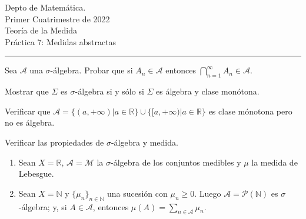 \documentclass{book}
\newcommand{\rr}{\mathbb{R}}
\newcommand{\nn}{\mathbb{N}}
\begin{document}


\begin{large}
\begin{bfseries} %
        \noindent Depto de Matem\'atica.\\
        Primer Cuatrimestre de 2022\\                                                                                                                                                                                                                                                                                                                                                
        Teoría de la Medida \\
        Práctica 7: Medidas abstractas

\end{bfseries}
\end{large}
\par\noindent\rule{\textwidth}{.5pt}






\begin{ejer}{}
Sea $\mathcal{A}$ una $\sigma$-álgebra.
Probar que si $A_n \in \mathcal{A}$ entonces $\bigcap\limits_{n=1}^{\infty} A_n \in \mathcal{A}$.
\end{ejer}

\begin{ejer}{}
 Mostrar que  $\Sigma$ es $\sigma$-álgebra si y sólo si $\Sigma$ es álgebra y clase monótona.
\end{ejer}


\begin{ejer}{}
 Verificar que $\mathcal{A}=\{(a,+\infty)|a \in \rr\}\cup \{[a,+\infty)|a \in \rr\}$ es clase mónotona pero no 
es álgebra.
\end{ejer}

\begin{ejer}{} Verificar las propiedades de $\sigma$-álgebra y medida.
\begin{enumerate}
\item Sean $X=\rr$, $\mathcal{A}=\mathcal{M}$ la $\sigma$-álgebra de los conjuntos medibles y $\mu$ la medida de Lebesgue.
\item Sean $X=\nn$ y $\{\mu_n\}_{n \in \nn}$ una sucesión con $\mu_n\geq 0$. 
Luego $\mathcal{A}=\mathcal{P}(\nn)$ es $\sigma$-álgebra; y, si $A\in \mathcal{A}$, entonces 
$\mu(A)=\sum\limits_{n \in \mathcal{A}} \mu_n$.
\end{enumerate}
\end{ejer}
\end{document}
